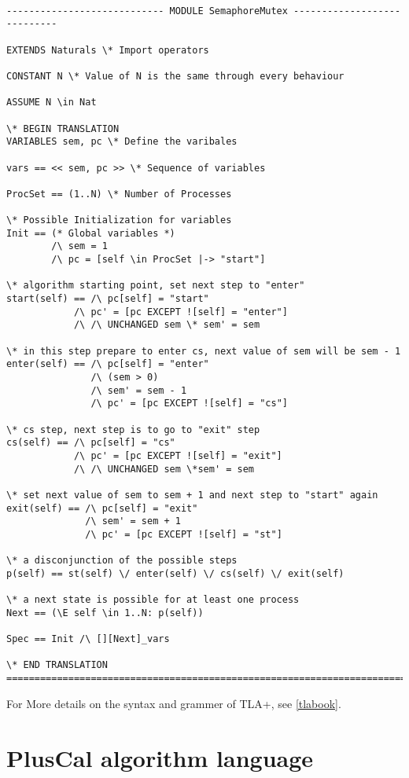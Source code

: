 \documentclass{thesul}
\begin{document}
\begin{lstlisting}[caption = SemaphoreMutex in TLA+, frame = tlrb, firstnumber = 1]

---------------------------- MODULE SemaphoreMutex ----------------------------

EXTENDS Naturals \* Import operators

CONSTANT N \* Value of N is the same through every behaviour

ASSUME N \in Nat

\* BEGIN TRANSLATION
VARIABLES sem, pc \* Define the varibales

vars == << sem, pc >> \* Sequence of variables

ProcSet == (1..N) \* Number of Processes

\* Possible Initialization for variables
Init == (* Global variables *) 
        /\ sem = 1
        /\ pc = [self \in ProcSet |-> "start"]

\* algorithm starting point, set next step to "enter"
start(self) == /\ pc[self] = "start"
            /\ pc' = [pc EXCEPT ![self] = "enter"]
            /\ /\ UNCHANGED sem \* sem' = sem

\* in this step prepare to enter cs, next value of sem will be sem - 1
enter(self) == /\ pc[self] = "enter"
               /\ (sem > 0)
               /\ sem' = sem - 1
               /\ pc' = [pc EXCEPT ![self] = "cs"]

\* cs step, next step is to go to "exit" step
cs(self) == /\ pc[self] = "cs"
            /\ pc' = [pc EXCEPT ![self] = "exit"]
            /\ /\ UNCHANGED sem \*sem' = sem

\* set next value of sem to sem + 1 and next step to "start" again
exit(self) == /\ pc[self] = "exit"
              /\ sem' = sem + 1
              /\ pc' = [pc EXCEPT ![self] = "st"]

\* a disconjunction of the possible steps
p(self) == st(self) \/ enter(self) \/ cs(self) \/ exit(self)

\* a next state is possible for at least one process
Next == (\E self \in 1..N: p(self))

Spec == Init /\ [][Next]_vars

\* END TRANSLATION
=============================================================================

\end{lstlisting}

For More details on the syntax and grammer of TLA+, see \ref{tlabook}.

\section{PlusCal algorithm language}
\end{document}

